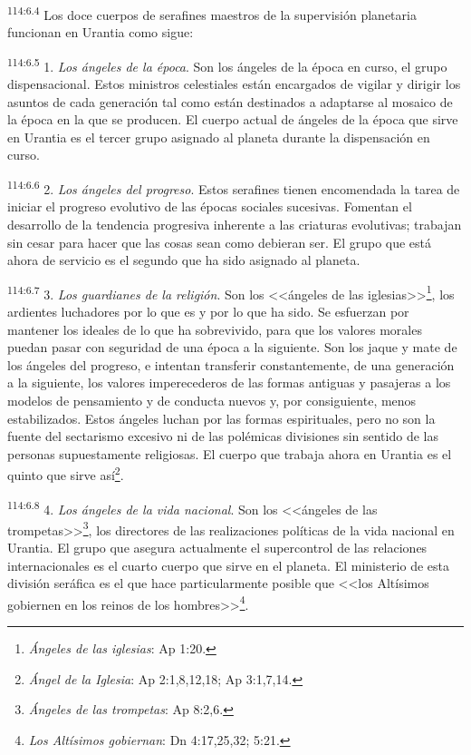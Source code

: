 \par
\textsuperscript{114:6.4} Los doce cuerpos de serafines maestros de la supervisión planetaria funcionan en Urantia como sigue:

\par
\textsuperscript{114:6.5} 1. \textit{Los ángeles de la época}. Son los ángeles de la época en curso, el grupo dispensacional. Estos ministros celestiales están encargados de vigilar y dirigir los asuntos de cada generación tal como están destinados a adaptarse al mosaico de la época en la que se producen. El cuerpo actual de ángeles de la época que sirve en Urantia es el tercer grupo asignado al planeta durante la dispensación en curso.

\par
\textsuperscript{114:6.6} 2. \textit{Los ángeles del progreso}. Estos serafines tienen encomendada la tarea de iniciar el progreso evolutivo de las épocas sociales sucesivas. Fomentan el desarrollo de la tendencia progresiva inherente a las criaturas evolutivas; trabajan sin cesar para hacer que las cosas sean como debieran ser. El grupo que está ahora de servicio es el segundo que ha sido asignado al planeta.

\par
\textsuperscript{114:6.7} 3. \textit{Los guardianes de la religión}. Son los <<ángeles de las iglesias>>\footnote{\textit{Ángeles de las iglesias}: Ap 1:20.}, los ardientes luchadores por lo que es y por lo que ha sido. Se esfuerzan por mantener los ideales de lo que ha sobrevivido, para que los valores morales puedan pasar con seguridad de una época a la siguiente. Son los jaque y mate de los ángeles del progreso, e intentan transferir constantemente, de una generación a la siguiente, los valores imperecederos de las formas antiguas y pasajeras a los modelos de pensamiento y de conducta nuevos y, por consiguiente, menos estabilizados. Estos ángeles luchan por las formas espirituales, pero no son la fuente del sectarismo excesivo ni de las polémicas divisiones sin sentido de las personas supuestamente religiosas. El cuerpo que trabaja ahora en Urantia es el quinto que sirve así\footnote{\textit{Ángel de la Iglesia}: Ap 2:1,8,12,18; Ap 3:1,7,14.}.

\par
\textsuperscript{114:6.8} 4. \textit{Los ángeles de la vida nacional}. Son los <<ángeles de las trompetas>>\footnote{\textit{Ángeles de las trompetas}: Ap 8:2,6.}, los directores de las realizaciones políticas de la vida nacional en Urantia. El grupo que asegura actualmente el supercontrol de las relaciones internacionales es el cuarto cuerpo que sirve en el planeta. El ministerio de esta división seráfica es el que hace particularmente posible que <<los Altísimos gobiernen en los reinos de los hombres>>\footnote{\textit{Los Altísimos gobiernan}: Dn 4:17,25,32; 5:21.}.

